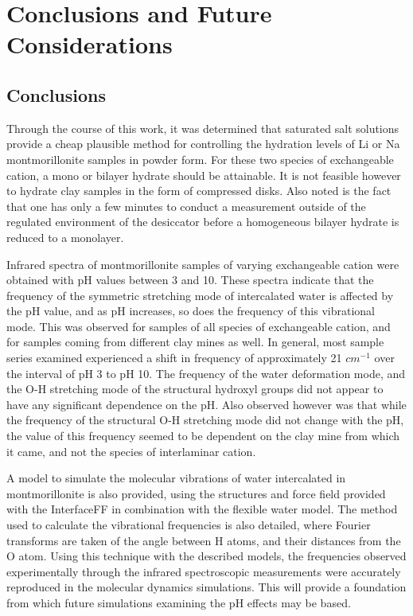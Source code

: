  
\chapter{Conclusions and Future Considerations}
\section{Conclusions}
Through the course of this work, it was determined that saturated salt solutions provide a cheap plausible method for controlling the hydration levels of Li or Na montmorillonite samples in powder form. For these two species of exchangeable cation, a mono or bilayer hydrate should be attainable. It is not feasible however to hydrate clay samples in the form of compressed disks. Also noted is the fact that one has only a few minutes to conduct a measurement outside of the regulated environment of the desiccator before a homogeneous bilayer hydrate is reduced to a monolayer.

Infrared spectra of montmorillonite samples of varying exchangeable cation were obtained with pH values between 3 and 10. These spectra indicate that the frequency of the symmetric stretching mode of intercalated water is affected by the pH value, and as pH increases, so does the frequency of this vibrational mode. This was observed for samples of all species of exchangeable cation, and for samples coming from different clay mines as well. In general, most sample series examined experienced a shift in frequency of approximately 21 $cm^{-1}$ over the interval of pH 3 to pH 10. The frequency of the water deformation mode, and the O-H stretching mode of the structural hydroxyl groups did not appear to have any significant dependence on the pH. Also observed however was that while the frequency of the structural O-H stretching mode did not change with the pH, the value of this frequency seemed to be dependent on the clay mine from which it came, and not the species of interlaminar cation.

A model to simulate the molecular vibrations of water intercalated in montmorillonite is also provided, using the structures and force field provided with the InterfaceFF in combination with the flexible water model. The method used to calculate the vibrational frequencies is also detailed, where Fourier transforms are taken of the angle between H atoms, and their distances from the O atom. Using this technique with the described models, the frequencies observed experimentally through the infrared spectroscopic measurements were accurately reproduced in the molecular dynamics simulations. This will provide a foundation from which future simulations examining the pH effects may be based.

